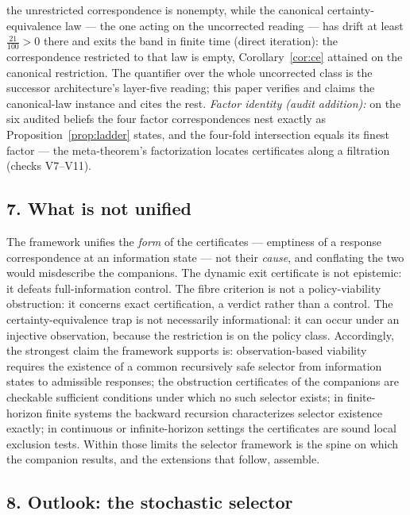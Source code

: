 \documentclass[10pt,twocolumn]{article}
\theoremstyle{definition}
\begin{document}
the unrestricted correspondence is nonempty, while the canonical
certainty-equivalence law --- the one acting on the uncorrected reading
--- has drift at least \(\tfrac{21}{100} > 0\) there and exits the band
in finite time (direct iteration): the correspondence restricted to that
law is empty, Corollary~\ref{cor:ce} attained on the canonical
restriction. The quantifier over the whole uncorrected class is the
successor architecture's layer-five reading; this paper verifies and
claims the canonical-law instance and cites the rest. \emph{Factor
identity (audit addition):} on the six audited beliefs the four factor
correspondences nest exactly as Proposition~\ref{prop:ladder} states,
and the four-fold intersection equals its finest factor --- the
meta-theorem's factorization locates certificates along a filtration
(checks V7--V11).

\subsection{7. What is not unified}\label{discipline}

The framework unifies the \emph{form} of the certificates --- emptiness of a
response correspondence at an information state --- not their \emph{cause},
and conflating the two would misdescribe the companions. The dynamic exit
certificate is not epistemic: it defeats full-information control. The fibre
criterion is not a policy-viability obstruction: it concerns exact
certification, a verdict rather than a control. The certainty-equivalence
trap is not necessarily informational: it can occur under an injective
observation, because the restriction is on the policy class. Accordingly,
the strongest claim the framework supports is: observation-based viability
requires the existence of a common recursively safe selector from
information states to admissible responses; the obstruction certificates of
the companions are checkable sufficient conditions under which no such
selector exists; in finite-horizon finite systems the backward recursion
characterizes selector existence exactly; in continuous or infinite-horizon
settings the certificates are sound local exclusion tests. Within those
limits the selector framework is the spine on which the companion results,
and the extensions that follow, assemble.

\subsection{8. Outlook: the stochastic selector}\label{outlook}
\end{document}
